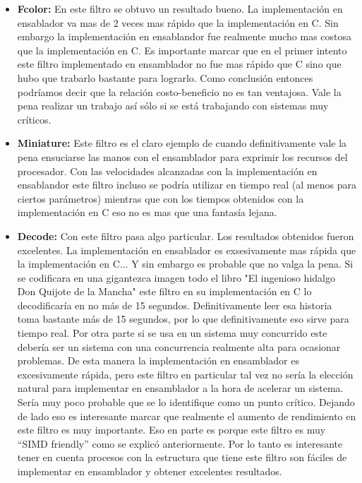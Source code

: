 \begin{itemize}
	\item \textbf{Fcolor:} En este filtro se obtuvo un resultado bueno.
La implementación en ensablador va mas de 2 veces mas rápido que la implementación
en C. Sin embargo la implementación en ensablandor fue realmente mucho mas costosa
que la implementación en C. Es importante marcar que en el primer
intento este filtro implementado en ensamblador no fue mas rápido que C sino
que hubo que trabarlo bastante para lograrlo. Como conclusión entonces
podríamos decir que la relación costo-beneficio no es tan ventajosa. Vale
la pena realizar un trabajo así sólo si se está trabajando con sistemas
muy críticos.
	\item \textbf{Miniature:} Este filtro es el claro ejemplo de cuando definitivamente
vale la pena ensuciarse las manos con el ensamblador para exprimir los recursos
del procesador. Con las velocidades alcanzadas con la implementación en ensablandor
este filtro incluso se podría utilizar en tiempo real (al menos para ciertos parámetros)
mientras que con los tiempos obtenidos con la implementación en C eso no es mas que una
fantasía lejana.
	\item \textbf{Decode:} Con este filtro pasa algo particular. Los resultados
obtenidos fueron excelentes. La implementación en ensablador es exsesivamente mas rápida
que la implementación en C... Y sin embargo es probable que no valga la pena. Si
se codificara en una gigantezca imagen todo el libro "El ingenioso hidalgo Don Quijote
de la Mancha" este filtro en su implementación en C lo decodificaría en no más de 15
segundos. Definitivamente leer esa historia toma bastante más de 15 segundos, por lo
que definitivamente eso sirve para tiempo real. Por otra parte si se usa en un sistema muy
concurrido este debería ser un sistema con una concurrencia realmente alta para ocasionar
problemas. De esta manera la implementación en ensamblador es excesivamente rápida, pero
este filtro en particular tal vez no sería la elección natural para implementar en
ensamblador a la hora de acelerar un sistema. Sería muy poco probable
que se lo identifique como un punto crítico.
	Dejando de lado eso es interesante marcar que realmente el aumento de rendimiento
en este filtro es muy importante. Eso en parte es porque este filtro es muy ``SIMD friendly''
como se explicó anteriormente. Por lo tanto es interesante tener en cuenta procesos
con la estructura que tiene este filtro son fáciles de implementar en ensamblador
y obtener excelentes resultados.
\end{itemize}

